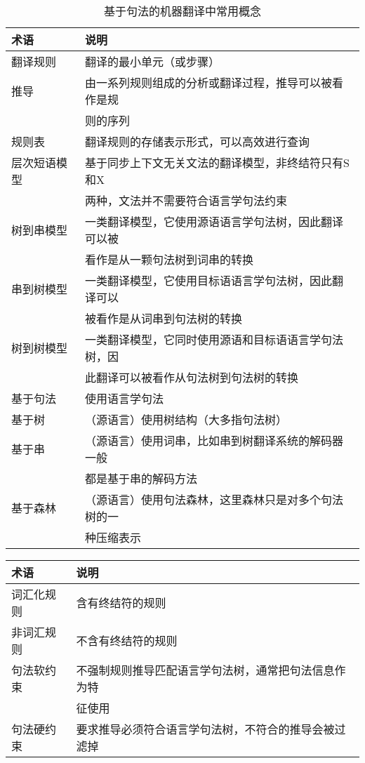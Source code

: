 \begin{table}[htp]{
\begin{center}
\caption{基于句法的机器翻译中常用概念}
\label{tab:4-2}
{
\begin{tabular}{p{6.5em} | l}
术语 & 说明 \\
\hline
\rule{0pt}{15pt}翻译规则 & 翻译的最小单元（或步骤） \\
\rule{0pt}{15pt}推导 & 由一系列规则组成的分析或翻译过程，推导可以被看作是规\\
&则的序列 \\
\rule{0pt}{15pt}规则表 & 翻译规则的存储表示形式，可以高效进行查询 \\
\rule{0pt}{15pt}层次短语模型 & 基于同步上下文无关文法的翻译模型，非终结符只有S和X\\
&两种，文法并不需要符合语言学句法约束 \\
\rule{0pt}{15pt}树到串模型 & 一类翻译模型，它使用源语语言学句法树，因此翻译可以被\\
&看作是从一颗句法树到词串的转换 \\
\rule{0pt}{15pt}串到树模型 & 一类翻译模型，它使用目标语语言学句法树，因此翻译可以\\
&被看作是从词串到句法树的转换 \\
\rule{0pt}{15pt}树到树模型 & 一类翻译模型，它同时使用源语和目标语语言学句法树，因\\
&此翻译可以被看作从句法树到句法树的转换 \\
\rule{0pt}{15pt}基于句法 & 使用语言学句法 \\
\rule{0pt}{15pt}基于树 &（源语言）使用树结构（大多指句法树） \\
\rule{0pt}{15pt}基于串 &（源语言）使用词串，比如串到树翻译系统的解码器一般\\
&都是基于串的解码方法 \\
\rule{0pt}{15pt}基于森林 &（源语言）使用句法森林，这里森林只是对多个句法树的一 \\
&种压缩表示 
\end{tabular}
}
\end{center}
}\end{table}
\begin{table}[htp]{
\begin{center}
{
\begin{tabular}{p{6.5em} | l}
术语 & 说明 \\
\hline
\rule{0pt}{15pt}词汇化规则 & 含有终结符的规则 \\
\rule{0pt}{15pt}非词汇规则 & 不含有终结符的规则 \\
\rule{0pt}{15pt}句法软约束 & 不强制规则推导匹配语言学句法树，通常把句法信息作为特\\
&征使用 \\
\rule{0pt}{15pt}句法硬约束 & 要求推导必须符合语言学句法树，不符合的推导会被过滤掉 \\
\end{tabular}
}
\end{center}
}\end{table}


